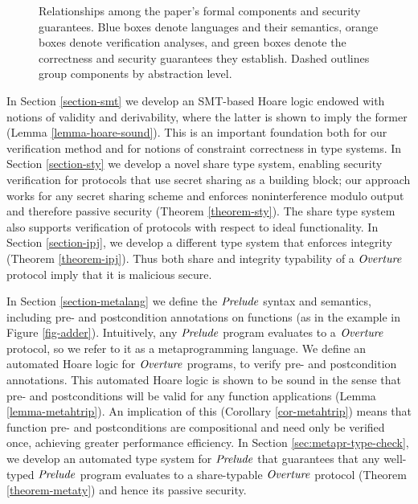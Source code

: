 \begin{figure}[t]
{\begin{tikzpicture}


\end{tikzpicture}
}
\caption{Relationships among the paper's formal components and security
guarantees. Blue boxes denote languages and their semantics, orange
boxes denote verification analyses, and green boxes denote the
correctness and security guarantees they establish. Dashed outlines
group components by abstraction level.}
\label{fig-framework-workflow}
\end{figure}

In Section \ref{section-smt} we develop an SMT-based Hoare logic
endowed with notions of validity and derivability, where the latter is
shown to imply the former (Lemma \ref{lemma-hoare-sound}). This is an
important foundation both for our verification method and for notions
of constraint correctness in type systems.  In Section
\ref{section-sty} we develop a novel share type system, enabling
security verification for protocols that use secret sharing as a
building block; our approach works for any secret sharing scheme and
enforces noninterference modulo output and therefore passive security
(Theorem \ref{theorem-sty}). The share type system also supports
verification of protocols with respect to ideal functionality.  In
Section \ref{section-ipj}, we develop a different type system that
enforces integrity (Theorem \ref{theorem-ipj}). Thus both share and
integrity typability of a $\mathit{Overture}$ protocol imply that it is
malicious secure.

In Section \ref{section-metalang} we define the $\mathit{Prelude}$ syntax and
semantics, including pre- and postcondition annotations on functions
(as in the example in Figure \ref{fig-adder}). Intuitively, any
$\mathit{Prelude}$ program evaluates to a $\mathit{Overture}$ protocol, so we refer to
it as a metaprogramming language. We define an automated Hoare logic
for $\mathit{Overture}$ programs, to verify pre- and postcondition
annotations. This automated Hoare logic is shown to be sound in the
sense that pre- and postconditions will be valid for any function
applications (Lemma \ref{lemma-metahtrip}). An implication of this
(Corollary \ref{cor-metahtrip}) means that function pre- and
postconditions are compositional and need only be verified once,
achieving greater performance efficiency. In Section
\ref{sec:metapr-type-check}, we develop an automated type system for
$\mathit{Prelude}$ that guarantees that any well-typed $\mathit{Prelude}$ program
evaluates to a share-typable $\mathit{Overture}$ protocol (Theorem
\ref{theorem-metaty}) and hence its passive security.

